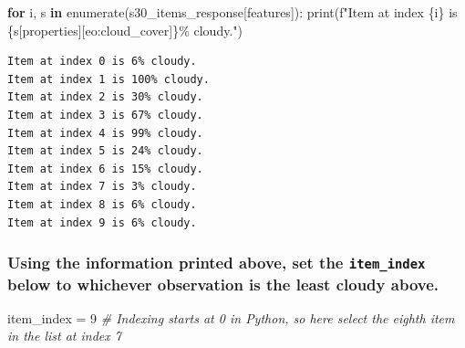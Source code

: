 \documentclass[
  letterpaper,
]{scrartcl}
\newenvironment{Shaded}{}{}
\newcommand{\BuiltInTok}[1]{#1}
\newcommand{\CommentTok}[1]{\textcolor[rgb]{0.38,0.63,0.69}{\textit{#1}}}
\newcommand{\ControlFlowTok}[1]{\textcolor[rgb]{0.00,0.44,0.13}{\textbf{#1}}}
\newcommand{\DecValTok}[1]{\textcolor[rgb]{0.25,0.63,0.44}{#1}}
\newcommand{\KeywordTok}[1]{\textcolor[rgb]{0.00,0.44,0.13}{\textbf{#1}}}
\newcommand{\NormalTok}[1]{#1}
\newcommand{\OperatorTok}[1]{\textcolor[rgb]{0.40,0.40,0.40}{#1}}
\newcommand{\SpecialCharTok}[1]{\textcolor[rgb]{0.25,0.44,0.63}{#1}}
\newcommand{\SpecialStringTok}[1]{\textcolor[rgb]{0.73,0.40,0.53}{#1}}
\newcommand{\StringTok}[1]{\textcolor[rgb]{0.25,0.44,0.63}{#1}}
\begin{document}
\begin{Shaded}
\begin{Highlighting}[]
\ControlFlowTok{for}\NormalTok{ i, s }\KeywordTok{in} \BuiltInTok{enumerate}\NormalTok{(s30\_items\_response[}\StringTok{\textquotesingle{}features\textquotesingle{}}\NormalTok{]):}
    \BuiltInTok{print}\NormalTok{(}\SpecialStringTok{f"Item at index }\SpecialCharTok{\{i\}}\SpecialStringTok{ is }\SpecialCharTok{\{s}\NormalTok{[}\StringTok{\textquotesingle{}properties\textquotesingle{}}\NormalTok{][}\StringTok{\textquotesingle{}eo:cloud\_cover\textquotesingle{}}\NormalTok{]}\SpecialCharTok{\}}\SpecialStringTok{\% cloudy."}\NormalTok{)}
\end{Highlighting}
\end{Shaded}

\begin{verbatim}
Item at index 0 is 6% cloudy.
Item at index 1 is 100% cloudy.
Item at index 2 is 30% cloudy.
Item at index 3 is 67% cloudy.
Item at index 4 is 99% cloudy.
Item at index 5 is 24% cloudy.
Item at index 6 is 15% cloudy.
Item at index 7 is 3% cloudy.
Item at index 8 is 6% cloudy.
Item at index 9 is 6% cloudy.
\end{verbatim}

\hypertarget{using-the-information-printed-above-set-the-item_index-below-to-whichever-observation-is-the-least-cloudy-above.}{%
\subsubsection{\texorpdfstring{Using the information printed above, set
the \texttt{item\_index} below to whichever observation is the least
cloudy
above.}{Using the information printed above, set the item\_index below to whichever observation is the least cloudy above.}}\label{using-the-information-printed-above-set-the-item_index-below-to-whichever-observation-is-the-least-cloudy-above.}}

\begin{Shaded}
\begin{Highlighting}[]
\NormalTok{item\_index }\OperatorTok{=} \DecValTok{9}  \CommentTok{\# Indexing starts at 0 in Python, so here select the eighth item in the list at index 7}
\end{Highlighting}
\end{Shaded}
\end{document}
